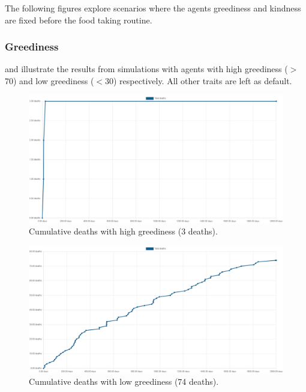 \newpage
The following figures explore scenarios where the agents greediness and kindness are fixed before the food taking routine. 

\subsubsection{Greediness}
\label{subsubsec: Greediness}

 and  illustrate the results from simulations with agents with high greediness ($>$70) and low greediness ($<$30) respectively. All other traits are left as default.

\begin{figure}[H]
    \begin{center}
        \includegraphics[scale=0.25]{009_team_7_agent_design/Images/Cumulative Deaths, fixed high greediness, T7Only, 2000days, 20food, 3deaths.png}
    \end{center}
    \caption{Cumulative deaths with high greediness (3 deaths).}
    \label{fig: Fixed High Greediness}
\end{figure}

\begin{figure}[H]
    \begin{center}
        \includegraphics[scale=0.25]{009_team_7_agent_design/Images/Cumulative Deaths, fixed low greediness, T7Only, 2000days, 20food, 74deaths.png}
    \end{center}
    \caption{Cumulative deaths with low greediness (74 deaths).}
    \label{fig: Fixed Low Greediness}
\end{figure}

